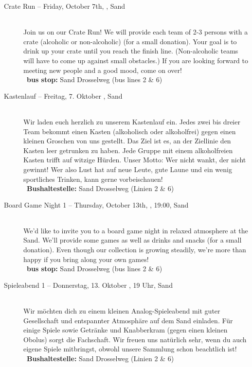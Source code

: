 \begin{description}
\ifml
	\item[Crate Run -- Friday, October 7th, \YEAR, Sand]~\\
	Join us on our Crate Run! We will provide each team of 2-3 persons with a crate (alcoholic or non-alcoholic) (for a small donation).
	Your goal is to drink up your crate until you reach the finish line. (Non-alcoholic teams will have to come up against small obstacles.)
	If you are looking forward to meeting new people and a good mood, come on over! \\
	~\textbf{bus stop:} Sand Drosselweg (bus lines 2 \& 6)
\else
	\item[Kastenlauf -- Freitag, 7. Oktober \YEAR, Sand]~\\
	Wir laden euch herzlich zu unserem Kastenlauf ein.
	Jedes zwei bis dreier Team bekommt einen Kasten (alkoholisch oder alkoholfrei) gegen einen kleinen Groschen von uns gestellt. 
	Das Ziel ist es, an der Ziellinie den Kasten leer getrunken zu haben. 
	Jede Gruppe mit einem alkoholfreien Kasten trifft auf witzige Hürden. 
	Unser Motto: Wer nicht wankt, der nicht gewinnt! Wer also Lust hat auf neue Leute, gute Laune und ein wenig sportliches Trinken, kann gerne vorbeischauen! \\
	~\textbf{Bushaltestelle:} Sand Drosselweg (Linien 2 \& 6)
\fi


\ifml
	\item[Board Game Night 1 -- Thursday, October 13th, \YEAR, 19:00, Sand]~\\
	We'd like to invite you to a board game night in relaxed atmosphere at the Sand.
    We'll provide some games as well as drinks and snacks (for a small donation).
    Even though our collection is growing steadily, we're more than happy if you bring along your own games!\\
	~\textbf{bus stop:} Sand Drosselweg (bus lines 2 \& 6)
\else
    \item[Spieleabend 1 -- Donnerstag, 13. Oktober \YEAR, 19 Uhr, Sand]~\\
	Wir möchten dich zu einem kleinen Analog-Spieleabend mit guter Gesellschaft und entspannter Atmosphäre auf dem Sand einladen.
    Für einige Spiele sowie Getränke und Knabberkram (gegen einen kleinen Obolus) sorgt die Fachschaft.
    Wir freuen uns natürlich sehr, wenn du auch eigene Spiele mitbringst, obwohl unsere Sammlung schon beachtlich ist!\\
	~\textbf{Bushaltestelle:} Sand Drosselweg (Linien 2 \& 6)
\fi


\end{description}
